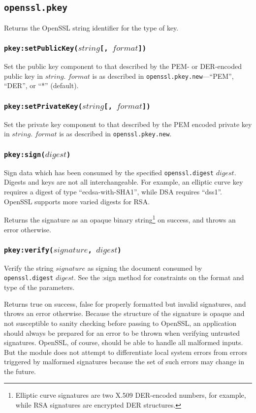 \documentclass[11pt, oneside]{memoir}
\newcommand*{\fn}[1]{\texttt{#1}\xspace}
\newcommand*{\module}[1]{\texttt{#1}\xspace}
\newcounter{toccols}
\newenvironment{Module}[1]{
	\subsection{\texttt{#1}}
	\addtocontents{toc}{
		\protect\begin{multicols}{\value{toccols}}
	}
}{
	\addtocontents{toc}{\protect\end{multicols}}
}
\begin{document}
\begin{Module}{openssl.pkey}
Returns the OpenSSL string identifier for the type of key.

\subsubsection[\fn{pkey:setPublicKey}]{\fn{pkey:setPublicKey($string$[, $format$])}}

Set the public key component to that described by the PEM- or DER-encoded public key in $string$. $format$ is as described in \fn{openssl.pkey.new}---``PEM'', ``DER'', or ``*'' (default).

\subsubsection[\fn{pkey:setPrivateKey}]{\fn{pkey:setPrivateKey($string$[, $format$])}}

Set the private key component to that described by the PEM encoded private key in $string$. $format$ is as described in \fn{openssl.pkey.new}.

\subsubsection[\fn{pkey:sign}]{\fn{pkey:sign($digest$)}}

Sign data which has been consumed by the specified \module{openssl.digest} $digest$. Digests and keys are not all interchangeable. For example, an elliptic curve key requires a digest of type ``ecdsa-with-SHA1'', while DSA requires ``dss1''. OpenSSL supports more varied digests for RSA.

Returns the signature as an opaque binary string\footnote{Elliptic curve signatures are two X.509 DER-encoded numbers, for example, while RSA signatures are encrypted DER structures.} on success, and throws an error otherwise.

\subsubsection[\fn{pkey:verify}]{\fn{pkey:verify($signature$, $digest$)}}

Verify the string $signature$ as signing the document consumed by \module{openssl.digest} $digest$. See the :sign method for constraints on the format and type of the parameters.

Returns true on success, false for properly formatted but invalid signatures, and throws an error otherwise. Because the structure of the signature is opaque and not susceptible to sanity checking before passing to OpenSSL, an application should always be prepared for an error to be thrown when verifying untrusted signatures. OpenSSL, of course, should be able to handle all malformed inputs. But the module does not attempt to differentiate local system errors from errors triggered by malformed signatures because the set of such errors may change in the future.


\end{Module}
\end{document}
